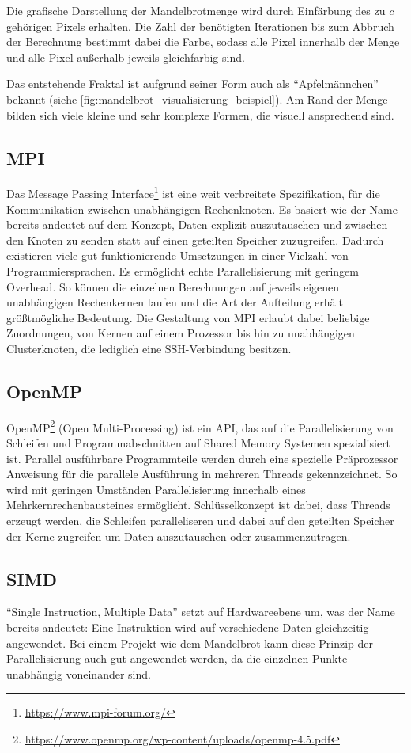 Die grafische Darstellung der Mandelbrotmenge wird durch Einfärbung des zu $c$ gehörigen Pixels erhalten.
Die Zahl der benötigten Iterationen bis zum Abbruch der Berechnung bestimmt dabei die Farbe, sodass alle Pixel
innerhalb der Menge und alle Pixel außerhalb jeweils gleichfarbig sind.

Das entstehende Fraktal ist aufgrund seiner Form auch als “Apfelmännchen” bekannt (siehe \autoref{fig:mandelbrot_visualisierung_beispiel}).
Am Rand der Menge bilden sich viele kleine und sehr komplexe Formen, die visuell ansprechend sind.

\subsection{MPI}
Das Message Passing Interface\footnote{\url{https://www.mpi-forum.org/}} ist eine weit verbreitete Spezifikation, für die Kommunikation zwischen unabhängigen Rechenknoten.
Es basiert wie der Name bereits andeutet auf dem Konzept, Daten explizit auszutauschen und zwischen den Knoten zu senden statt auf einen geteilten Speicher zuzugreifen.
Dadurch existieren viele gut funktionierende Umsetzungen in einer Vielzahl von Programmiersprachen.
Es ermöglicht echte Parallelisierung mit geringem Overhead.
So können die einzelnen Berechnungen auf jeweils eigenen unabhängigen Rechenkernen laufen und
die Art der Aufteilung erhält größtmögliche Bedeutung.
Die Gestaltung von MPI erlaubt dabei beliebige Zuordnungen, von Kernen auf einem Prozessor bis hin zu unabhängigen Clusterknoten, die lediglich eine SSH-Verbindung besitzen.

\subsection{OpenMP}

OpenMP\footnote{\url{https://www.openmp.org/wp-content/uploads/openmp-4.5.pdf}} (Open Multi-Processing) ist ein API, das auf die Parallelisierung von Schleifen und Programmabschnitten auf Shared Memory Systemen spezialisiert ist.
Parallel ausführbare Programmteile werden durch eine spezielle Präprozessor Anweisung für die parallele Ausführung in mehreren Threads gekennzeichnet.
So wird mit geringen Umständen Parallelisierung innerhalb eines Mehrkernrechenbausteines
ermöglicht.
Schlüsselkonzept ist dabei, dass Threads erzeugt werden, die Schleifen paralleliseren und dabei auf den geteilten Speicher
der Kerne zugreifen um Daten auszutauschen oder zusammenzutragen.

\subsection{SIMD} \label{par:introduction_simd}
\enquote{Single Instruction, Multiple Data} setzt auf Hardwareebene um, was der Name bereits andeutet:
Eine Instruktion wird auf verschiedene Daten gleichzeitig angewendet.
Bei einem Projekt wie dem Mandelbrot kann diese Prinzip der Parallelisierung auch gut angewendet werden,
da die einzelnen Punkte unabhängig voneinander sind.


